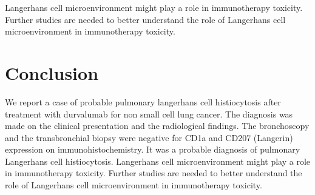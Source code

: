 \documentclass{article}
\begin{document}
Langerhans cell microenvironment might play a role in immunotherapy toxicity. Further studies are needed to better understand the role of Langerhans cell microenvironment in immunotherapy toxicity.

\section{Conclusion}
We report a case of probable pulmonary langerhans cell histiocytosis after treatment with durvalumab for non small cell lung cancer. The diagnosis was made on the clinical presentation and the radiological findings. The bronchoscopy and the transbronchial biopsy were negative for CD1a and CD207 (Langerin) expression on immunohistochemistry. It was a probable diagnosis of pulmonary Langerhans cell histiocytosis.
Langerhans cell microenvironment might play a role in immunotherapy toxicity. Further studies are needed to better understand the role of Langerhans cell microenvironment in immunotherapy toxicity.

\printbibliography
\end{document}
